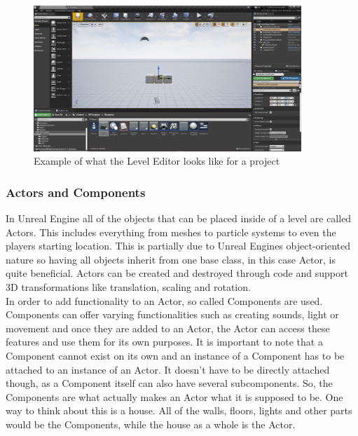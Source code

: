\begin{figure}[htpb]
	\centering
	\includegraphics[width=0.9\textwidth]{fig/UnrealEngineLevelEditor.png}
	\caption[Unreal Engine Level Editor]{Example of what the Level Editor looks like for a project \protect}
	\label{fig:LevelEditor}
\end{figure}

\subsubsection{Actors and Components}

In Unreal Engine all of the objects that can be placed inside of a level are called Actors\cite{bib:UEActors}. This includes everything from meshes to particle systems to even the players starting location. This is partially due to Unreal Engines object-oriented nature so having all objects inherit from one base class, in this case Actor, is quite beneficial. Actors can be created and destroyed through code and support 3D transformations like translation, scaling and rotation.\\

In order to add functionality to an Actor, so called Components are used\cite{bib:UEComponents}. Components can offer varying functionalities such as creating sounds, light or movement and once they are added to an Actor, the Actor can access these features and use them for its own purposes. It is important to note that a Component cannot exist on its own and an instance of a Component has to be attached to an instance of an Actor. It doesn't have to be directly attached though, as a Component itself can also have several subcomponents. So, the Components are what actually makes an Actor what it is supposed to be. One way to think about this is a house. All of the walls, floors, lights and other parts would be the Components, while the house as a whole is the Actor.\\

